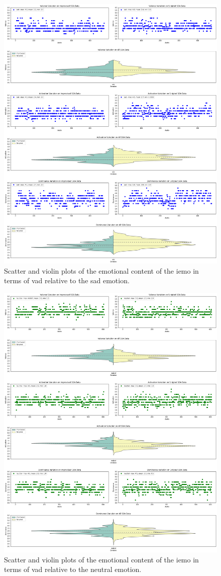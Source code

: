 \begin{figure}[H]
	\centering
	\includegraphics[width=\linewidth]{figs/appendix/IEMOCAP_data_study/sadScatterViolins.png}
	\caption{Scatter and violin plots of the emotional content of the \ac{iemo} in terms of \ac{vad} relative to the sad emotion.}
\end{figure}

\begin{figure}[H]
	\centering
	\includegraphics[width=\linewidth]{figs/appendix/IEMOCAP_data_study/neutralScatterViolins.png}
	\caption{Scatter and violin plots of the emotional content of the \ac{iemo} in terms of \ac{vad} relative to the neutral emotion.}
\end{figure}

